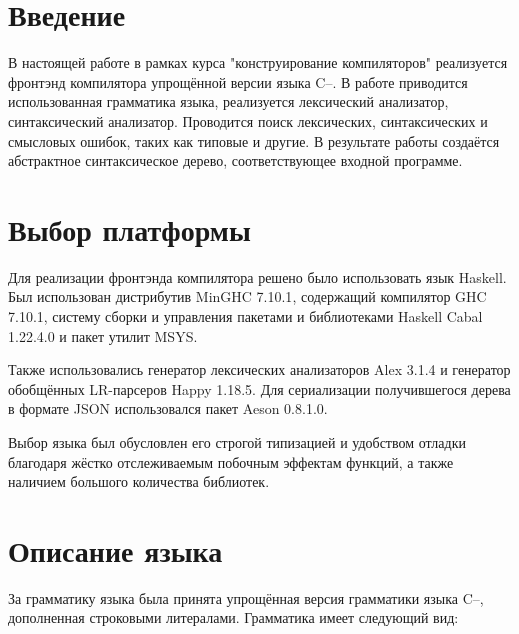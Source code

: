 \documentclass[a4paper,12pt]{report}
\numberwithin{equation}{section}
\begin{document}
 

\setcounter{page}{2}

\tableofcontents

\section{Введение}
В настоящей работе в рамках курса "конструирование компиляторов" реализуется фронтэнд компилятора упрощённой версии языка C--.
В работе приводится использованная грамматика языка, реализуется лексический анализатор, синтаксический анализатор.
Проводится поиск лексических, синтаксических и смысловых ошибок, таких как типовые и другие.
В результате работы создаётся абстрактное синтаксическое дерево, соответствующее входной программе.

\section{Выбор платформы}
Для реализации фронтэнда компилятора решено было использовать язык Haskell.
Был использован дистрибутив MinGHC 7.10.1\cite{minghc}, содержащий компилятор GHC 7.10.1\cite{ghc}, систему сборки и управления пакетами и библиотеками Haskell Cabal 1.22.4.0\cite{cabal} и пакет утилит MSYS\cite{msys}.

Также использовались генератор лексических анализаторов Alex 3.1.4\cite{alex} и генератор обобщённых LR-парсеров Happy 1.18.5\cite{happy}. 
Для сериализации получившегося дерева в формате JSON использовался пакет Aeson 0.8.1.0\cite{aeson}.

Выбор языка был обусловлен его строгой типизацией и удобством отладки благодаря жёстко отслеживаемым побочным эффектам функций, а также наличием большого количества библиотек.

\section{Описание языка}
За грамматику языка была принята упрощённая версия\cite{cmm-grammar} грамматики языка C--, дополненная строковыми литералами.
Грамматика имеет следующий вид:
\end{document}
